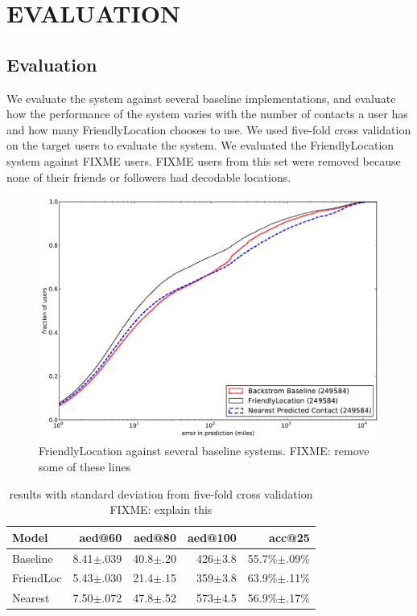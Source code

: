 \ifdefined\THESIS
    \chapter{\uppercase{Evaluation}}
\else
    \section{Evaluation}
\fi

We evaluate the system against several baseline implementations, and evaluate
how the performance of the system varies with the number of contacts a user has
and how many FriendlyLocation chooses to use.
We used five-fold cross validation on the target users to evaluate the system.
We evaluated the FriendlyLocation system against FIXME users.
FIXME users from this set were removed because none of their friends or
followers had decodable locations.


\begin{figure}[tb]
\centering
\includegraphics[width=\linewidth]{figures/fl_basic.pdf}
\caption{
    FriendlyLocation against several baseline systems.
    FIXME: remove some of these lines
}
\label{fig:baseline}
\end{figure}

\begin{table}[tb]
\centering
\begin{tabular}{l  r r r r}
    Model
    & aed@60
    & aed@80
    & aed@100
    & acc@25 \\
    \hline
    Baseline & 8.41$\pm$.039 & 40.8$\pm$.20 & 426$\pm$3.8 & 55.7\%$\pm$.09\% \\
    FriendLoc & 5.43$\pm$.030 & 21.4$\pm$.15 & 359$\pm$3.8 & 63.9\%$\pm$.11\% \\
    Nearest & 7.50$\pm$.072 & 47.8$\pm$.52 & 573$\pm$4.5 & 56.9\%$\pm$.17\% \\
\end{tabular}
\caption{
results with standard deviation from five-fold cross validation
FIXME: explain this
}
\label{tab:results}
\end{table}

